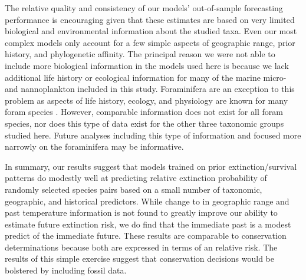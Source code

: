 \documentclass[12pt,letterpaper]{article}
\begin{document}
\begin{refsection}
The relative quality and consistency of our models' out-of-sample forecasting performance is encouraging given that these estimates are based on very limited biological and environmental information about the studied taxa. Even our most complex models only account for a few simple aspects of geographic range, prior history, and phylogenetic affinity. The principal reason we were not able to include more biological information in the models used here is because we lack additional life history or ecological information for many of the marine micro- and nannoplankton included in this study. Foraminifera are an exception to this problem as aspects of life history, ecology, and physiology are known for many foram species \citep{Ezard2011}. However, comparable information does not exist for all foram species, nor does this type of data exist for the other three taxonomic groups studied here. Future analyses including this type of information and focused more narrowly on the foraminifera may be informative. 

In summary, our results suggest that models trained on prior extinction/survival patterns do modestly well at predicting relative extinction probability of randomly selected species pairs based on a small number of taxonomic, geographic, and historical predictors. While change to in geographic range and past temperature information is not found to greatly improve our ability to estimate future extinction risk, we do find that the immediate past is a modest predict of the immediate future. These results are comparable to conservation determinations because both are expressed in terms of an relative risk. The results of this simple exercise suggest that conservation decisions would be bolstered by including fossil data.









\printbibliography
\end{refsection}
\clearpage
\end{document}
